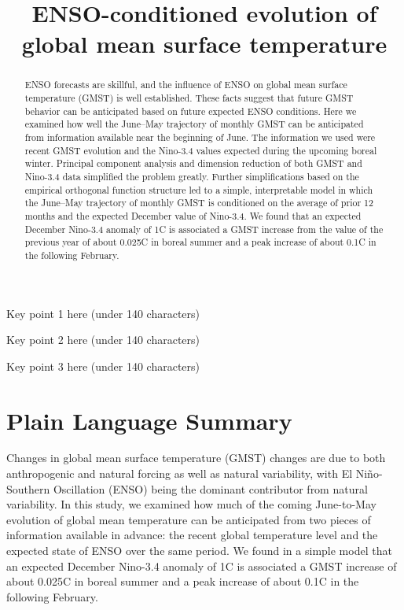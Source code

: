 \documentclass[draft]{agujournal2019}
\begin{document}
\title{ENSO-conditioned evolution of global mean surface temperature}




\begin{keypoints}
\item Key point 1 here (under 140 characters)
\item Key point 2 here (under 140 characters)
\item Key point 3 here (under 140 characters)
\end{keypoints}

\begin{abstract}
ENSO forecasts are skillful, and the influence of ENSO on global
  mean surface temperature (GMST) is well established. These facts
  suggest that future GMST behavior can be anticipated based on future
  expected ENSO conditions. Here we examined how well the June--May trajectory of monthly
  GMST can be anticipated from information available near the beginning of June. The information we used were recent GMST evolution and the
  Nino-3.4 values expected during the upcoming boreal winter. Principal component analysis and dimension reduction of both GMST and
  Nino-3.4 data simplified the problem greatly. Further simplifications based on the empirical orthogonal
  function structure led to a simple, interpretable model in which the
  June--May trajectory of monthly GMST is conditioned on the average
  of prior 12 months and the expected December value of Nino-3.4. We found that an expected December Nino-3.4 anomaly of
  1\textdegree C is associated a GMST increase from the value of the
  previous year of about 0.025\textdegree C in boreal summer and a
  peak increase of about 0.1\textdegree C in the following February.
\end{abstract}

\section*{Plain Language Summary}
Changes in global mean surface temperature (GMST) changes are due to
  both anthropogenic and natural forcing as well as natural
  variability, with El Niño-Southern Oscillation (ENSO) being the
  dominant contributor from natural variability. In this study, we
  examined how much of the coming June-to-May evolution of global mean
  temperature can be anticipated from two pieces of information
  available in advance: the recent global temperature level and the
  expected state of ENSO over the same period. We found in a simple
  model that an expected December Nino-3.4 anomaly of 1\textdegree C
  is associated a GMST increase of about 0.025\textdegree C in boreal
  summer and a peak increase of about 0.1\textdegree C in the
  following February.
\end{document}
